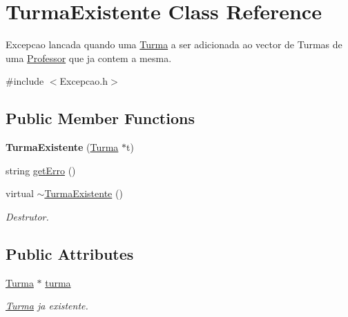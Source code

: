 \hypertarget{class_turma_existente}{\section{Turma\-Existente Class Reference}
\label{class_turma_existente}
}


Excepcao lancada quando uma \hyperlink{class_turma}{Turma} a ser adicionada ao vector de Turmas de uma \hyperlink{class_professor}{Professor} que ja contem a mesma.  




{\ttfamily \#include $<$Excepcao.\-h$>$}

\subsection*{Public Member Functions}
\begin{DoxyCompactItemize}
\item 
\hypertarget{class_turma_existente_abc57fc0e6dc6b40e7e09a55dc572aea9}{{\bfseries Turma\-Existente} (\hyperlink{class_turma}{Turma} $\ast$t)}\label{class_turma_existente_abc57fc0e6dc6b40e7e09a55dc572aea9}

\item 
string \hyperlink{class_turma_existente_a96340570dfd3b2a4122c8ba8820dac4a}{get\-Erro} ()
\item 
\hypertarget{class_turma_existente_a6b3ec0715645fd0ea2589dace1ccd0bf}{virtual \hyperlink{class_turma_existente_a6b3ec0715645fd0ea2589dace1ccd0bf}{$\sim$\-Turma\-Existente} ()}\label{class_turma_existente_a6b3ec0715645fd0ea2589dace1ccd0bf}

\begin{DoxyCompactList}\small\item\em Destrutor. \end{DoxyCompactList}\end{DoxyCompactItemize}
\subsection*{Public Attributes}
\begin{DoxyCompactItemize}
\item 
\hypertarget{class_turma_existente_a7af4e8a63dd324498ebd01cee1a956f3}{\hyperlink{class_turma}{Turma} $\ast$ \hyperlink{class_turma_existente_a7af4e8a63dd324498ebd01cee1a956f3}{turma}}\label{class_turma_existente_a7af4e8a63dd324498ebd01cee1a956f3}

\begin{DoxyCompactList}\small\item\em \hyperlink{class_turma}{Turma} ja existente. \end{DoxyCompactList}\end{DoxyCompactItemize}


